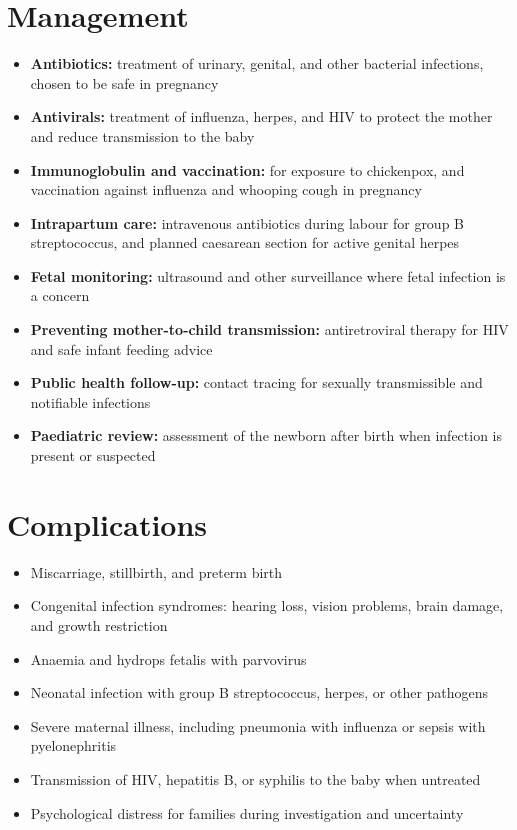 \section*{Management}
\begin{itemize}
    \item \textbf{Antibiotics:} treatment of urinary, genital, and other bacterial infections, chosen to be safe in pregnancy
    \item \textbf{Antivirals:} treatment of influenza, herpes, and HIV to protect the mother and reduce transmission to the baby
    \item \textbf{Immunoglobulin and vaccination:} for exposure to chickenpox, and vaccination against influenza and whooping cough in pregnancy
    \item \textbf{Intrapartum care:} intravenous antibiotics during labour for group B streptococcus, and planned caesarean section for active genital herpes
    \item \textbf{Fetal monitoring:} ultrasound and other surveillance where fetal infection is a concern
    \item \textbf{Preventing mother-to-child transmission:} antiretroviral therapy for HIV and safe infant feeding advice
    \item \textbf{Public health follow-up:} contact tracing for sexually transmissible and notifiable infections
    \item \textbf{Paediatric review:} assessment of the newborn after birth when infection is present or suspected
\end{itemize}

\section*{Complications}
\begin{itemize}
    \item Miscarriage, stillbirth, and preterm birth
    \item Congenital infection syndromes: hearing loss, vision problems, brain damage, and growth restriction
    \item Anaemia and hydrops fetalis with parvovirus
    \item Neonatal infection with group B streptococcus, herpes, or other pathogens
    \item Severe maternal illness, including pneumonia with influenza or sepsis with pyelonephritis
    \item Transmission of HIV, hepatitis B, or syphilis to the baby when untreated
    \item Psychological distress for families during investigation and uncertainty
\end{itemize}

